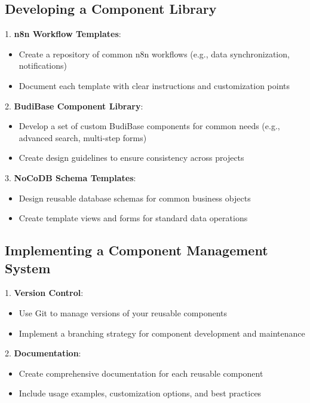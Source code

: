 \subsection{Developing a Component Library}

1. \textbf{n8n Workflow Templates}:
\begin{itemize}
    \item Create a repository of common n8n workflows (e.g., data synchronization, notifications)
    \item Document each template with clear instructions and customization points
\end{itemize}

2. \textbf{BudiBase Component Library}:
\begin{itemize}
    \item Develop a set of custom BudiBase components for common needs (e.g., advanced search, multi-step forms)
    \item Create design guidelines to ensure consistency across projects
\end{itemize}

3. \textbf{NoCoDB Schema Templates}:
\begin{itemize}
    \item Design reusable database schemas for common business objects
    \item Create template views and forms for standard data operations
\end{itemize}


\subsection{Implementing a Component Management System}

1. \textbf{Version Control}:
\begin{itemize}
    \item Use Git to manage versions of your reusable components
    \item Implement a branching strategy for component development and maintenance
\end{itemize}

2. \textbf{Documentation}:
\begin{itemize}
    \item Create comprehensive documentation for each reusable component
    \item Include usage examples, customization options, and best practices
\end{itemize}


